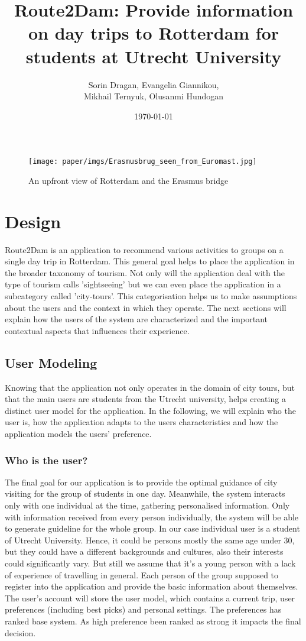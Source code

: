 \documentclass[11pt,a4paper,oneside]{article}
\title{\textbf{Route2Dam: Provide information on day trips to Rotterdam for students at Utrecht University}\newline \newline \newline}
\date{\today}
\author{Sorin Dragan, Evangelia Giannikou, \\Mikhail Ternyuk, Olusanmi Hundogan}
\begin{document}
\maketitle


\begin{figure}[H]
    \texttt{[image: paper/imgs/Erasmusbrug\_seen\_from\_Euromast.jpg]}
    \caption{An upfront view of Rotterdam and the Erasmus bridge}
\end{figure}


\clearpage
\section{Design}
Route2Dam is an application to recommend various activities to groups on a single day trip in Rotterdam. This general goal helps to place the application in the broader taxonomy of tourism. Not only will the application deal with the type of tourism \citeauthor{dunnross_SightseeingTouristsMotivation_1991} calls 'sightseeing' but we can even place the application in a subcategory called 'city-tours'. This categorisation helps us to make assumptions about the users and the context in which they operate. The next sections will explain how the users of the system are characterized and the important contextual aspects that influences their experience. 
\subsection{User Modeling}
\label{lbl:UM}
Knowing that the application not only operates in the domain of city tours, but that the main users are students from the Utrecht university, helps creating a distinct user model for the application. In the following, we will explain who the user is, how the application adapts to the users characteristics and how the application models the users' preference. 
\subsubsection{Who is the user?}
The final goal for our application is to provide the optimal guidance of city visiting for the group of students in one day. Meanwhile, the system interacts only with one individual at the time, gathering personalised information. Only with information received from every person individually, the system will be able to generate guideline for the whole group. In our case individual user is a student of Utrecht University. Hence, it could be persons mostly the same age under 30, but they could have a different backgrounds and cultures, also their interests could significantly vary. But still we assume that it’s a young person with a lack of experience of travelling in general. Each person of the group supposed to register into the application and provide the basic information about themselves. The user’s account will store the user model, which contains a current trip, user preferences (including best picks) and personal settings. The preferences has ranked base system. As high preference been ranked as strong it impacts the final decision. 	
\end{document}
